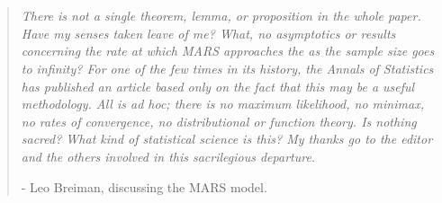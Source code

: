 \chapter*{}
\begin{quote}
	\textit{There is not a single theorem, lemma, or proposition in the whole paper. Have my senses taken leave of me? What, no asymptotics or results concerning the rate at which MARS approaches the  as the sample size goes to infinity? For one of the few times in its history, the Annals of Statistics has published an article based only on the fact that this may be a useful methodology. All is ad hoc; there is no maximum likelihood, no minimax, no rates of convergence, no distributional or function theory. Is nothing sacred? What kind of statistical science is this? My thanks go to the editor and the others involved in this sacrilegious departure.}
	
	- Leo Breiman, discussing the MARS model. 
\end{quote}
